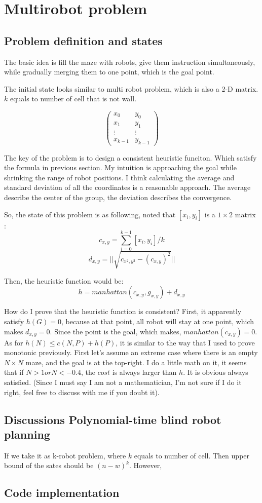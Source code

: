 \clearpage
\section{Multirobot problem}
\subsection{Problem definition and states}

The basic idea is fill the maze with robots, give them instruction simultaneously, while gradually merging them to one point, which is the goal point.

The initial state looks similar to multi robot problem, which is also a 2-D matrix. $k$ equals to number of cell that is not wall.

$$\begin{pmatrix}
x_0 & y_0 \\
x_1 & y_1 \\
\vdots & \vdots \\	
x_{k-1} & y_{k-1}
\end{pmatrix}$$

The key of the problem is to design a consistent heuristic funciton. Which satisfy the formula in previous section. My intuition is approaching the goal while shrinking the range of robot positions. I think calculating the average and standard deviation of all the coordinates is a reasonable approach. The average describe the center of the group, the deviation describes the convergence. 

So, the state of this problem is as following, noted that $[x_i,y_i]$ is a $1\times 2$ matrix :
$$c_{x,y} = \sum^{k-1}_{i=0}[x_i,y_i]/k$$
$$d_{x,y} = ||\sqrt{ c_{x^2,y^2} - (c_{x,y})^2}||$$

Then, the heuristic function would be:
$$h = manhattan(c_{x,y}, g_{x,y}) + d_{x,y}$$

How do I prove that the heuristic function is consistent? First, it apparently satisfy $h(G)=0$, because at that point, all robot will stay at one point, which makes $ d_{x,y} = 0$. Since the point is the goal, which makes, $manhattan(c_{x,y})=0$. As for $h(N) \leq c(N,P)+h(P) $, it is similar to the way that I used to prove monotonic previously. First let's assume an extreme case where there is an empty $N \times N$ maze, and the goal is at the top-right. I do a little math on it, it seems that if $N > 1 or N < -0.4$, the $cost$ is always larger than $h$. It is obvious always satisfied. (Since I must say I am not a mathematician, I'm not sure if I do it right, feel free to discuss with me if you doubt it).

\subsection{Discussions Polynomial-time blind robot planning}
If we take it as k-robot problem, where $k$ equals to number of cell. Then upper bound of the sates should be $(n-w)^k$. However, 

\subsection{Code implementation}
